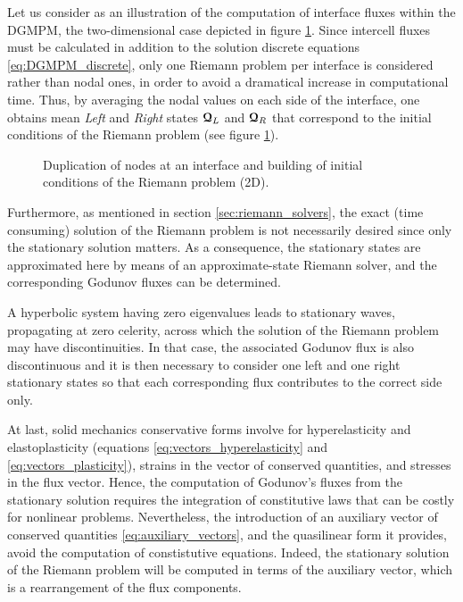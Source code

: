 Let us consider as an illustration of the computation of interface fluxes within the DGMPM, the two-dimensional case depicted in figure \ref{fig:2D_edge}. Since intercell fluxes must be calculated in addition to the solution discrete equations \eqref{eq:DGMPM_discrete}, only one Riemann problem per interface is considered rather than nodal ones, in order to avoid a dramatical increase in computational time. Thus, by averaging the nodal values on each side of the interface, one obtains mean \textit{Left} and \textit{Right} states ${\boldsymbol{\mathcal{Q}}}_L$ and ${\boldsymbol{\mathcal{Q}}}_R$ that correspond to the initial conditions of the Riemann problem (see figure \ref{fig:2D_edge}).
\begin{figure}[h!]
  \centering
  
  \caption{Duplication of nodes at an interface and building of initial conditions of the Riemann problem (2D).}
  \label{fig:2D_edge}
\end{figure}
Furthermore, as mentioned in section \ref{sec:riemann_solvers}, the exact (time consuming) solution of the Riemann problem is not necessarily desired since only the stationary solution matters. As a consequence, the stationary states are approximated here by means of an approximate-state Riemann solver, and the corresponding Godunov fluxes can be determined.
\begin{remark}
A hyperbolic system having zero eigenvalues leads to stationary waves, propagating at zero celerity, across which the solution of the Riemann problem may have discontinuities. In that case, the associated Godunov flux is also discontinuous and it is then necessary to consider one left and one right stationary states so that each corresponding flux contributes to the correct side only. 
\end{remark}
At last, solid mechanics conservative forms involve for hyperelasticity and elastoplasticity (equations \eqref{eq:vectors_hyperelasticity} and \eqref{eq:vectors_plasticity}), strains in the vector of conserved quantities, and stresses in the flux vector. Hence, the computation of Godunov's fluxes from the stationary solution requires the integration of constitutive laws that can be costly for nonlinear problems. Nevertheless, the introduction of an auxiliary vector of conserved quantities \eqref{eq:auxiliary_vectors}, and the quasilinear form it provides, avoid the computation of constistutive equations. Indeed, the stationary solution of the Riemann problem will be computed in terms of the auxiliary vector, which is a rearrangement of the flux components. 


